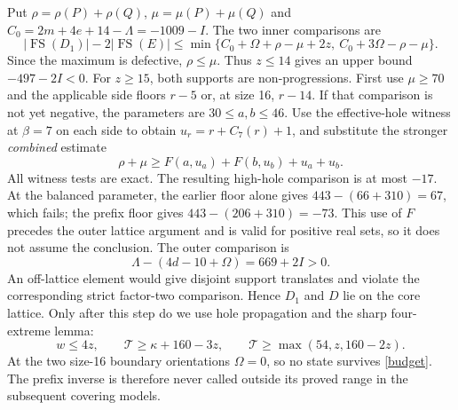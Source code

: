 \documentclass[11pt,a4paper]{article}
\newcommand{\FS}{\operatorname{FS}}
\newcommand{\T}{\mathcal T}
\begin{document}
Put $\rho=\rho(P)+\rho(Q)$, $\mu=\mu(P)+\mu(Q)$ and
$C_0=2m+4e+14-\Lambda=-1009-I$. The two inner comparisons are
\[
 |\FS(D_1)|-2|\FS(E)|\le
 \min\{C_0+\Omega+\rho-\mu+2z,\ C_0+3\Omega-\rho-\mu\}.
\]
Since the maximum is defective, $\rho\le\mu$. Thus $z\le14$ gives
an upper bound $-497-2I<0$.
For $z\ge15$, both supports are non-progressions. First use
$\mu\ge70$ and the applicable side floors $r-5$ or, at size 16,
$r-14$. If that comparison is not yet negative, the parameters are
$30\le a,b\le46$. Use the effective-hole witness at $\beta=7$ on
each side to obtain $u_r=r+C_7(r)+1$, and substitute the stronger
\emph{combined} estimate
\[
 \rho+\mu\ge F(a,u_a)+F(b,u_b)+u_a+u_b.
\]
All witness tests are exact. The resulting high-hole comparison is at
most $-17$. At the balanced parameter, the earlier floor alone gives
$443-(66+310)=67$, which fails; the prefix floor gives
$443-(206+310)=-73$. This use of $F$ precedes the outer lattice argument
and is valid for positive real sets, so it does not assume the conclusion.
The outer comparison is
\[
 \Lambda-(4d-10+\Omega)=669+2I>0.
\]
An off-lattice element would give disjoint support translates and
violate the corresponding strict factor-two comparison. Hence $D_1$
and $D$ lie on the core lattice. Only after this step do we use hole
propagation and the sharp four-extreme lemma:
\begin{equation}\label{budget}
 w\le4z,\qquad\T\ge\kappa+160-3z,\qquad
 \T\ge\max(54,z,160-2z).
\end{equation}
At the two size-16 boundary orientations $\Omega=0$, so no state
survives \eqref{budget}. The prefix inverse is therefore never called
outside its proved range in the subsequent covering models.
\end{document}
